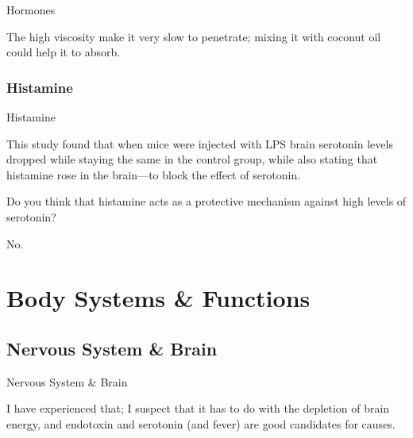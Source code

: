 \documentclass[11pt,oneside,openany,extrafontsizes]{memoir}
\begin{document}
\begin{standalonequote}{Hormones}

    \begin{answer}
        The high viscosity make it very slow to penetrate; mixing it with coconut oil could help it to absorb.
    \end{answer}
\end{standalonequote}

\subsection{Histamine}

\begin{qaexchange}{Histamine}

    \begin{question}
        This study found that when mice were injected with LPS brain serotonin levels dropped while staying the same in the control group, while also stating that histamine rose in the brain---to block the effect of serotonin.

		Do you think that histamine acts as a protective mechanism against high levels of serotonin? 
    \end{question}

    \begin{answer}
      No.
    \end{answer}
\end{qaexchange}

\chapter{Body Systems \& Functions}

\section{Nervous System \& Brain}

\begin{standalonequote}{Nervous System \& Brain}

    \begin{answer}
        I have experienced that; I suspect that it has to do with the depletion of brain energy, and endotoxin and serotonin (and fever) are good candidates for causes.
    \end{answer}
\end{standalonequote}
\end{document}

